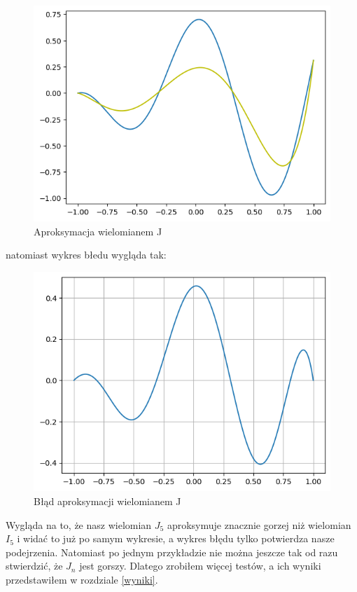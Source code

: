 \documentclass[11pt,wide]{mwart}
\begin{document}
\begin{figure}[H]
	\begin{center}
	\includegraphics[scale=0.7]{przyklad_J}
	\end{center}
	\caption{Aproksymacja wielomianem J}
\end{figure} 
\noindent natomiast wykres błedu wygląda tak: 
\begin{figure}[H]
	\begin{center}
	\includegraphics[scale=0.7]{blad_J}
	\end{center}
	\caption{Błąd aproksymacji wielomianem J}
\end{figure}
Wygląda na to, że nasz wielomian $J_5$ aproksymuje znacznie gorzej niż wielomian $I_5$ i widać to już po samym wykresie, a wykres błędu tylko potwierdza nasze podejrzenia. Natomiast po jednym przykładzie nie można jeszcze tak od razu stwierdzić, że $J_n$ jest gorszy. Dlatego zrobiłem więcej testów, a ich wyniki przedstawiłem w rozdziale \ref{wyniki}.
\end{document}
